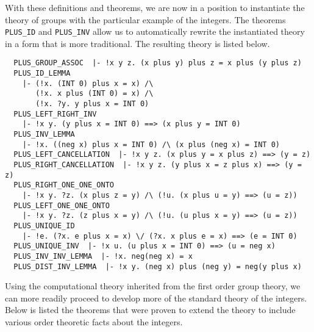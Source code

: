 With these definitions and theorems, we are now in a position to instantiate
the theory of groups with the particular example of the integers.  The theorems
{\tt PLUS\_ID} and {\tt PLUS\_INV} allow us to automatically rewrite the
instantiated theory in a form that is more traditional.  The resulting theory
is listed below.
\begin{verbatim}
  PLUS_GROUP_ASSOC  |- !x y z. (x plus y) plus z = x plus (y plus z)
  PLUS_ID_LEMMA
    |- (!x. (INT 0) plus x = x) /\
       (!x. x plus (INT 0) = x) /\
       (!x. ?y. y plus x = INT 0)
  PLUS_LEFT_RIGHT_INV
    |- !x y. (y plus x = INT 0) ==> (x plus y = INT 0)
  PLUS_INV_LEMMA
    |- !x. ((neg x) plus x = INT 0) /\ (x plus (neg x) = INT 0)
  PLUS_LEFT_CANCELLATION  |- !x y z. (x plus y = x plus z) ==> (y = z)
  PLUS_RIGHT_CANCELLATION  |- !x y z. (y plus x = z plus x) ==> (y = z)
  PLUS_RIGHT_ONE_ONE_ONTO
    |- !x y. ?z. (x plus z = y) /\ (!u. (x plus u = y) ==> (u = z))
  PLUS_LEFT_ONE_ONE_ONTO
    |- !x y. ?z. (z plus x = y) /\ (!u. (u plus x = y) ==> (u = z))
  PLUS_UNIQUE_ID
    |- !e. (?x. e plus x = x) \/ (?x. x plus e = x) ==> (e = INT 0)
  PLUS_UNIQUE_INV  |- !x u. (u plus x = INT 0) ==> (u = neg x)
  PLUS_INV_INV_LEMMA  |- !x. neg(neg x) = x
  PLUS_DIST_INV_LEMMA  |- !x y. (neg x) plus (neg y) = neg(y plus x)
\end{verbatim}  
Using the computational theory inherited from the first order group
theory, we can more readily proceed to develop more of the standard theory
of the integers.  Below is listed the theorems that were proven to extend
the theory to include various order theoretic facts about the integers.
